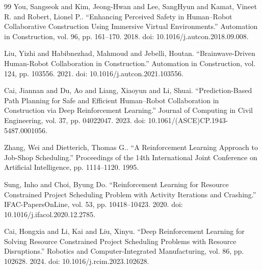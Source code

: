 \documentclass[fleqn,10pt]{wlpeerj}
\begin{document}
\begin{thebibliography}{99}
 You, Sangseok and Kim, Jeong-Hwan and Lee, SangHyun and Kamat, Vineet R. and Robert, Lionel P.. ``Enhancing Perceived Safety in Human--Robot Collaborative Construction Using Immersive Virtual Environments.'' Automation in Construction, vol. 96, pp. 161--170. 2018. doi: 10.1016/j.autcon.2018.09.008.

 Liu, Yizhi and Habibnezhad, Mahmoud and Jebelli, Houtan. ``Brainwave-Driven Human-Robot Collaboration in Construction.'' Automation in Construction, vol. 124, pp. 103556. 2021. doi: 10.1016/j.autcon.2021.103556.

 Cai, Jiannan and Du, Ao and Liang, Xiaoyun and Li, Shuai. ``Prediction-Based Path Planning for Safe and Efficient Human--Robot Collaboration in Construction via Deep Reinforcement Learning.'' Journal of Computing in Civil Engineering, vol. 37, pp. 04022047. 2023. doi: 10.1061/(ASCE)CP.1943-5487.0001056.

 Zhang, Wei and Dietterich, Thomas G.. ``A Reinforcement Learning Approach to Job-Shop Scheduling.'' Proceedings of the 14th International Joint Conference on Artificial Intelligence, pp. 1114--1120. 1995.

 Sung, Inho and Choi, Byung Do. ``Reinforcement Learning for Resource Constrained Project Scheduling Problem with Activity Iterations and Crashing.'' IFAC-PapersOnLine, vol. 53, pp. 10418--10423. 2020. doi: 10.1016/j.ifacol.2020.12.2785.

 Cai, Hongxia and Li, Kai and Liu, Xinyu. ``Deep Reinforcement Learning for Solving Resource Constrained Project Scheduling Problems with Resource Disruptions.'' Robotics and Computer-Integrated Manufacturing, vol. 86, pp. 102628. 2024. doi: 10.1016/j.rcim.2023.102628.
\end{thebibliography}
\end{document}
